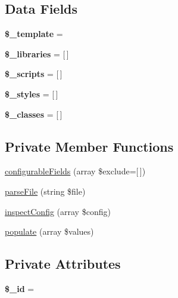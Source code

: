 \subsection*{Data Fields}
\begin{DoxyCompactItemize}
\item 
\mbox{\label{class_lora_1_1_page_component_a353afce17912a98c6a9ead92e679570d}} 
{\bfseries \$\+\_\+template} = \textquotesingle{}\textquotesingle{}
\item 
\mbox{\label{class_lora_1_1_page_component_a8ad159a11a3bfceca008de351d6fbebc}} 
{\bfseries \$\+\_\+libraries} = \mbox{[}$\,$\mbox{]}
\item 
\mbox{\label{class_lora_1_1_page_component_a714e6e780b17b3b8e7db069f2a96a119}} 
{\bfseries \$\+\_\+scripts} = \mbox{[}$\,$\mbox{]}
\item 
\mbox{\label{class_lora_1_1_page_component_a9c54ba83a52cee3c5a4b47dea3412c53}} 
{\bfseries \$\+\_\+styles} = \mbox{[}$\,$\mbox{]}
\item 
\mbox{\label{class_lora_1_1_page_component_a429c9bf2a1a7123e7d350631751eff67}} 
{\bfseries \$\+\_\+classes} = \mbox{[}$\,$\mbox{]}
\end{DoxyCompactItemize}
\subsection*{Private Member Functions}
\begin{DoxyCompactItemize}
\item 
\hyperlink{class_lora_1_1_page_component_a3b38056ae9a3c2cada8000895f46b9cb}{configurable\+Fields} (array \$exclude=\mbox{[}$\,$\mbox{]})
\item 
\hyperlink{class_lora_1_1_page_component_a63ba1656485acf76a0d23e8f64fdfa1d}{parse\+File} (string \$file)
\item 
\hyperlink{class_lora_1_1_page_component_a836e6e03df9ed37584042af4708928d6}{inspect\+Config} (array \$config)
\item 
\hyperlink{class_lora_1_1_page_component_a8a5a7e2a8a27e02e0e68243d88ee339c}{populate} (array \$values)
\end{DoxyCompactItemize}
\subsection*{Private Attributes}
\begin{DoxyCompactItemize}
\item 
\mbox{\label{class_lora_1_1_page_component_a64da16c4a1c7b2dc6784f6ef26341ed7}} 
{\bfseries \$\+\_\+id} = \textquotesingle{}\textquotesingle{}
\end{DoxyCompactItemize}


